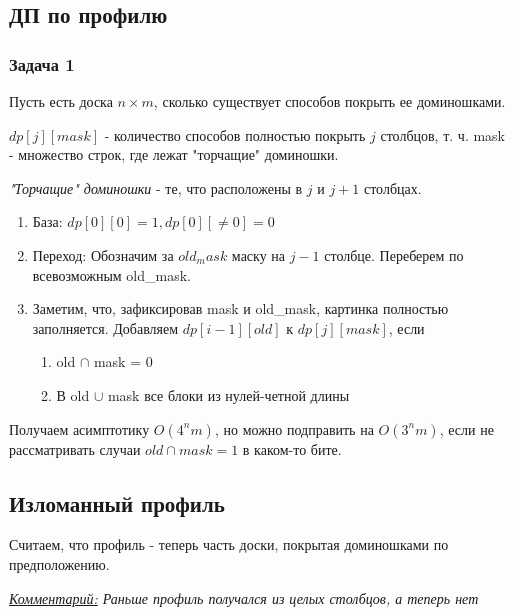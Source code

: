 \subsection{ДП по профилю}

\subsubsection{Задача 1}

Пусть есть доска $n \times m$, сколько существует способов покрыть ее доминошками.

$dp[j][mask]$ - количество способов полностью покрыть $j$ столбцов, т. ч. mask - множество строк, где лежат "торчащие" доминошки.

\textit{"Торчащие" доминошки} - те, что расположены в $j$ и $j + 1$ столбцах.

\begin{enumerate}
  \item База: $dp[0][0] = 1, dp[0][\ne 0] = 0$
  \item Переход:
  Обозначим за $old_mask$ маску на $j-1$ столбце. Переберем по всевозможным old\_mask.
  \item Заметим, что, зафиксировав mask и old\_mask, картинка полностью заполняется.
Добавляем $dp[i - 1][old]$ к $dp[j][mask]$, если 
    \begin{enumerate}
  \item old $\cap$ mask = 0
  \item В old $\cup$ mask все блоки из нулей-четной длины
  \end{enumerate}
\end{enumerate}

Получаем асимптотику $O(4^n m)$, но можно подправить на $O(3^n m)$, если не рассматривать случаи $old \cap mask = 1$ в каком-то бите.

\subsection{Изломанный профиль}

Считаем, что профиль - теперь часть доски, покрытая доминошками по предположению. 

\textit{\underline{Комментарий:} Раньше профиль получался из целых столбцов, а теперь нет}



